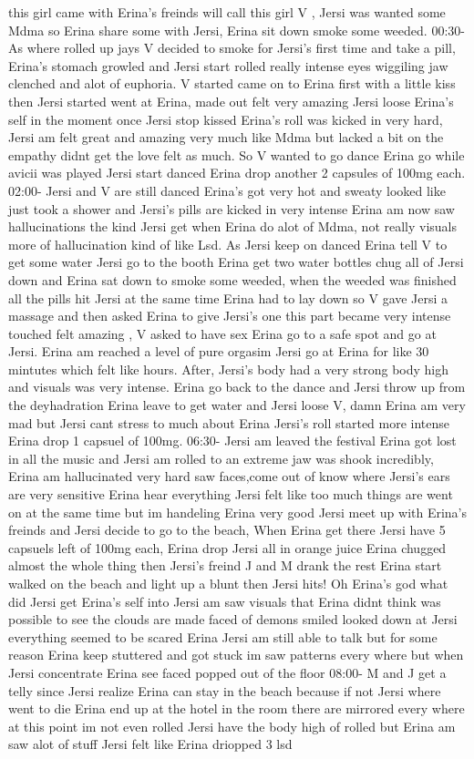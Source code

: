 \documentclass[12pt]{book}
\begin{document}
this girl came with Erina's freinds will call this girl V , Jersi was wanted some Mdma so Erina share some with Jersi, Erina sit down smoke some weeded. 00:30- As where rolled up jays V decided to smoke for Jersi's first time and take a pill, Erina's stomach growled and Jersi start rolled really intense eyes wiggiling jaw clenched and alot of euphoria. V started came on to Erina first with a little kiss then Jersi started went at Erina, made out felt very amazing Jersi loose Erina's self in the moment once Jersi stop kissed Erina's roll was kicked in very hard, Jersi am felt great and amazing very much like Mdma but lacked a bit on the empathy didnt get the love felt as much. So V wanted to go dance Erina go while avicii was played Jersi start danced Erina drop another 2 capsules of 100mg each. 02:00- Jersi and V are still danced Erina's got very hot and sweaty looked like just took a shower and Jersi's pills are kicked in very intense Erina am now saw hallucinations the kind Jersi get when Erina do alot of Mdma, not really visuals more of hallucination kind of like Lsd. As Jersi keep on danced Erina tell V to get some water Jersi go to the booth Erina get two water bottles chug all of Jersi down and Erina sat down to smoke some weeded, when the weeded was finished all the pills hit Jersi at the same time Erina had to lay down so V gave Jersi a massage and then asked Erina to give Jersi's one this part became very intense touched felt amazing , V asked to have sex Erina go to a safe spot and go at Jersi. Erina am reached a level of pure orgasim Jersi go at Erina for like 30 mintutes which felt like hours. After, Jersi's body had a very strong body high and visuals was very intense. Erina go back to the dance and Jersi throw up from the deyhadration Erina leave to get water and Jersi loose V, damn Erina am very mad but Jersi cant stress to much about Erina Jersi's roll started more intense Erina drop 1 capsuel of 100mg. 06:30- Jersi am leaved the festival Erina got lost in all the music and Jersi am rolled to an extreme jaw was shook incredibly, Erina am hallucinated very hard saw faces,come out of know where Jersi's ears are very sensitive Erina hear everything Jersi felt like too much things are went on at the same time but im handeling Erina very good Jersi meet up with Erina's freinds and Jersi decide to go to the beach, When Erina get there Jersi have 5 capsuels left of 100mg each, Erina drop Jersi all in orange juice Erina chugged almost the whole thing then Jersi's freind J and M drank the rest Erina start walked on the beach and light up a blunt then Jersi hits! Oh Erina's god what did Jersi get Erina's self into Jersi am saw visuals that Erina didnt think was possible to see the clouds are made faced of demons smiled looked down at Jersi everything seemed to be scared Erina Jersi am still able to talk but for some reason Erina keep stuttered and got stuck im saw patterns every where but when Jersi concentrate Erina see faced popped out of the floor 08:00- M and J get a telly since Jersi realize Erina can stay in the beach because if not Jersi where went to die Erina end up at the hotel in the room there are mirrored every where at this point im not even rolled Jersi have the body high of rolled but Erina am saw alot of stuff Jersi felt like Erina driopped 3 lsd 
\end{document}

